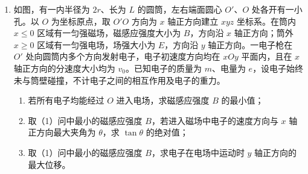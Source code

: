 \documentclass[\gkver]{gaokaozhenti}
\begin{document}
\begin{enumerate}
{\begin{enumerate}
	\item
	$5\times10^{-3} \Umc$

\end{enumerate}
}

\item
如图，有一内半径为 $2r$、长为 $L$ 的圆筒，左右端面圆心 $O'$、$O$ 处各开有一小孔。以 $O$ 为坐标原点，取 $O'O$ 方向为 $x$ 轴正方向建立 $xyz$ 坐标系。在筒内 $x \leq 0$ 区域有一匀强磁场，磁感应强度大小为 $B$，方向沿 $x$ 轴正方向；筒外 $x \geq 0$ 区域有一匀强电场，场强大小为 $E$，方向沿 $y$ 轴正方向。一电子枪在 $O'$ 处向圆筒内多个方向发射电子，电子初速度方向均在 $xOy$ 平面内，且在 $x$ 轴正方向的分速度大小均为 $v_{0}$。已知电子的质量为 $m$、电量为 $e$，设电子始终未与筒壁碰撞，不计电子之间的相互作用及电子的重力。
\begin{enumerate}
	\item
	若所有电子均能经过 $O$ 进入电场，求磁感应强度 $B$ 的最小值；
	\item
	取（1）问中最小的磁感应强度 $B$，若进入磁场中电子的速度方向与 $x$ 轴正方向最大夹角为 $\theta$，求 $\tan\theta$ 的绝对值；
	\item
	取（1）问中最小的磁感应强度 $B$，求电子在电场中运动时 $y$ 轴正方向的最大位移。
\end{enumerate}

\end{enumerate}
\end{document}
